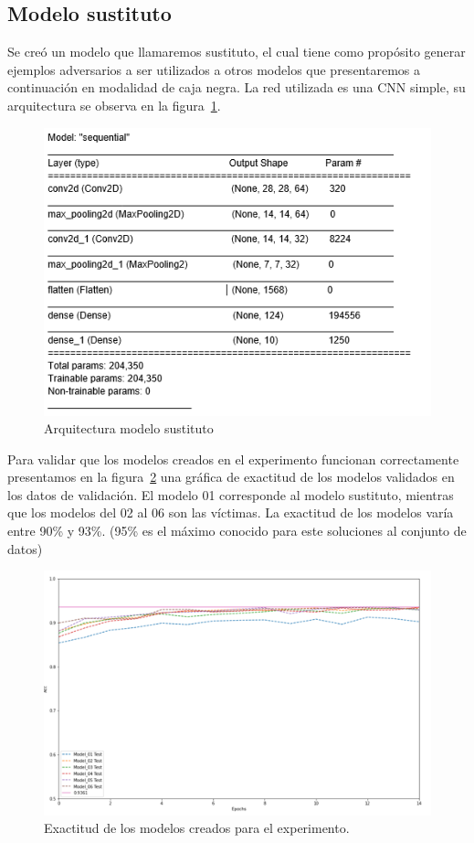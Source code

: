 \subsection{Modelo sustituto}
Se creó un modelo que llamaremos sustituto, el cual tiene como propósito generar ejemplos adversarios a ser utilizados a otros modelos que presentaremos a continuación en modalidad de caja negra. La red utilizada es una CNN simple, su arquitectura se observa en la figura~\ref{fig:model}.

\begin{figure}[!h]
\centering
\includegraphics{Figures/model_F_MNIST.PNG}
\decoRule
\caption[Arquitectura modelo sustituto fashion-MNIST]{Arquitectura modelo sustituto}
\label{fig:model}
\end{figure}

Para validar que los modelos creados en el experimento funcionan correctamente presentamos en la figura~\ref{fig:37} una gráfica de exactitud de los modelos validados en los datos de validación. El modelo 01 corresponde al modelo sustituto, mientras que los modelos del 02 al 06 son las víctimas. La exactitud de los modelos varía entre 90\% y 93\%. (95\% es el máximo conocido para este soluciones al conjunto de datos)

\begin{figure}[!h]
\centering
\includegraphics{Figures/figura_37.PNG}
\decoRule
\caption[Arquitectura modelo sustituto fashion-MNIST]{Exactitud de los modelos creados para el experimento.}
\label{fig:37}
\end{figure}

